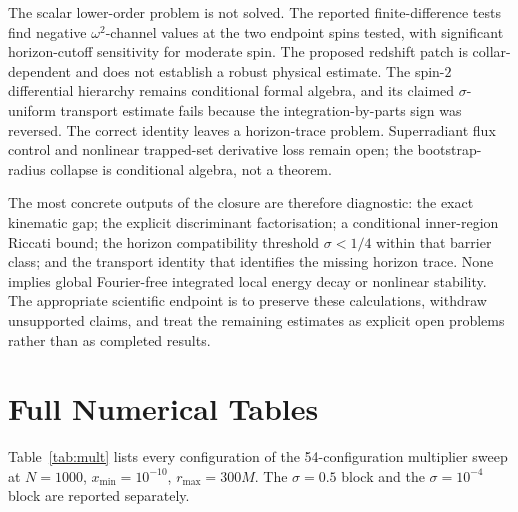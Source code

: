 \documentclass[11pt,a4paper]{article}
\theoremstyle{remark}
\theoremstyle{definition}
\begin{document}
The scalar lower-order problem is not solved. The reported finite-difference tests find negative $\omega^2$-channel values at the two endpoint spins tested, with significant horizon-cutoff sensitivity for moderate spin. The proposed redshift patch is collar-dependent and does not establish a robust physical estimate. The spin-$2$ differential hierarchy remains conditional formal algebra, and its claimed $\sigma$-uniform transport estimate fails because the integration-by-parts sign was reversed. The correct identity leaves a horizon-trace problem. Superradiant flux control and nonlinear trapped-set derivative loss remain open; the bootstrap-radius collapse is conditional algebra, not a theorem.

The most concrete outputs of the closure are therefore diagnostic: the exact kinematic gap; the explicit discriminant factorisation; a conditional inner-region Riccati bound; the horizon compatibility threshold $\sigma<1/4$ within that barrier class; and the transport identity that identifies the missing horizon trace. None implies global Fourier-free integrated local energy decay or nonlinear stability. The appropriate scientific endpoint is to preserve these calculations, withdraw unsupported claims, and treat the remaining estimates as explicit open problems rather than as completed results.
\appendix
\section{Full Numerical Tables}
\label{sec:appA}

Table~\ref{tab:mult} lists every configuration of the 54-configuration multiplier sweep at $N=1000$, $x_{\min}=10^{-10}$, $r_{\max}=300M$. The $\sigma=0.5$ block and the $\sigma=10^{-4}$ block are reported separately.
\end{document}
